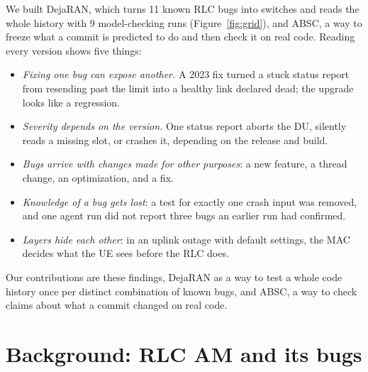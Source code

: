 \documentclass[sigconf,10pt]{acmart}
\begin{document}
We built DejaRAN, which turns 11 known RLC bugs into switches and reads
the whole history with 9 model-checking runs
(Figure~\ref{fig:grid}), and ABSC, a way to freeze what a commit is
predicted to do and then check it on real code. Reading every version
shows five things:
\begin{itemize}[leftmargin=2.2em,nosep]
\item[\textbf{F1}] \emph{Fixing one bug can expose another.} A 2023 fix
  turned a stuck status report from resending past the limit into a
  healthy link declared dead; the upgrade looks like a regression.
\item[\textbf{F2}] \emph{Severity depends on the version.} One status
  report aborts the DU, silently reads a missing slot, or crashes it,
  depending on the release and build.
\item[\textbf{F3}] \emph{Bugs arrive with changes made for other
  purposes}: a new feature, a thread change, an optimization, and a fix.
\item[\textbf{F4}] \emph{Knowledge of a bug gets lost}: a test for
  exactly one crash input was removed, and one agent run did not report
  three bugs an earlier run had confirmed.
\item[\textbf{F5}] \emph{Layers hide each other}: in an uplink outage
  with default settings, the MAC decides what the UE sees before the RLC
  does.
\end{itemize}
Our contributions are these findings, DejaRAN as a way to test a whole
code history once per distinct combination of known bugs, and ABSC, a
way to check claims about what a commit changed on real code.

\section{Background: RLC AM and its bugs}
\label{sec:rlc}
\end{document}
